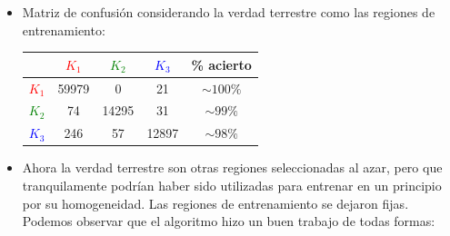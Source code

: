 \begin{itemize}
\item Matriz de confusión considerando la verdad terrestre como las regiones de entrenamiento: 

\begin{center}
 \begin{tabular}{c|c|c|c|c|}
\cline{2-5}
 & \textcolor{red}{$K_{1}$} & \textcolor{green}{$K_{2}$} & \textcolor{blue}{$K_{3}$} & \% acierto \\
\hline
\multicolumn{1}{|c|}{\textcolor{red}{$K_{1}$}} & 59979 & 0 & 21 & $\sim 100\%$ \\
\multicolumn{1}{|c|}{\textcolor{green}{$K_{2}$}} & 74  & 14295 & 31 & $\sim 99\%$ \\
\multicolumn{1}{|c|}{\textcolor{blue}{$K_{3}$}} & 246   & 57  & 12897 & $\sim 98\%$ \\
\hline
\end{tabular}
\end{center}

\item Ahora la verdad terrestre son otras regiones seleccionadas al azar, pero que tranquilamente podrían haber sido utilizadas para entrenar en un principio por su homogeneidad. Las regiones de entrenamiento se dejaron fijas. Podemos observar que el algoritmo hizo un buen trabajo de todas formas:

\begin{figure}[H]\centering
   \captionsetup{labelformat=empty}
 

\end{figure}
\end{itemize}
